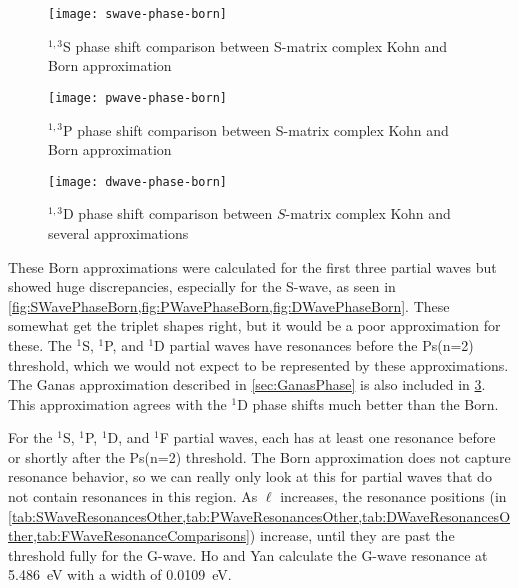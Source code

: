\documentclass[Dissertation.tex]{subfiles}
\begin{document}
\begin{figure}
	\centering
	\texttt{[image: swave-phase-born]}
	\caption[$^{1,3}$S complex Kohn and Born comparison]{$^{1,3}$S phase shift comparison between S-matrix complex Kohn and Born approximation}
	\label{fig:SWavePhaseBorn}
\end{figure}

\begin{figure}
	\centering
	\texttt{[image: pwave-phase-born]}
	\caption[$^{1,3}$P complex Kohn and Born comparison]{$^{1,3}$P phase shift comparison between S-matrix complex Kohn and Born approximation}
	\label{fig:PWavePhaseBorn}
\end{figure}

\begin{figure}
	\centering
	\texttt{[image: dwave-phase-born]}
	\caption[$^{1,3}$D complex Kohn and Born comparison]{$^{1,3}$D phase shift comparison between $S$-matrix complex Kohn and several approximations}
	\label{fig:DWavePhaseBorn}
\end{figure}


These Born approximations were calculated for the first three partial waves 
but showed huge discrepancies, especially for the S-wave, as seen in
\cref{fig:SWavePhaseBorn,fig:PWavePhaseBorn,fig:DWavePhaseBorn}. These somewhat get 
the triplet shapes right, but it would be a poor approximation for these. The 
$^1$S, $^1$P, and $^1$D partial waves have resonances before the Ps(n=2)
threshold, which we would not expect to be represented by these approximations.
The Ganas approximation described in \cref{sec:GanasPhase} is also included in
\cref{fig:DWavePhaseBorn}. This approximation agrees with the $^1$D phase
shifts much better than the Born.

For the $^1$S, $^1$P, $^1$D, and $^1$F partial waves, each has at least one 
resonance before or shortly after the Ps(n=2) threshold. The Born 
approximation does not capture resonance behavior, so we can really only look 
at this for partial waves that do not contain resonances in this region. As
$\ell$ increases, the resonance positions
(in \cref{tab:SWaveResonancesOther,tab:PWaveResonancesOther,tab:DWaveResonancesOther,tab:FWaveResonanceComparisons})
increase, until they are past the threshold fully for the G-wave.
Ho and Yan \cite{Ho2000} calculate the G-wave resonance
at \SI{5.486}{eV} with a width of \SI{0.0109}{eV}.
\end{document}
